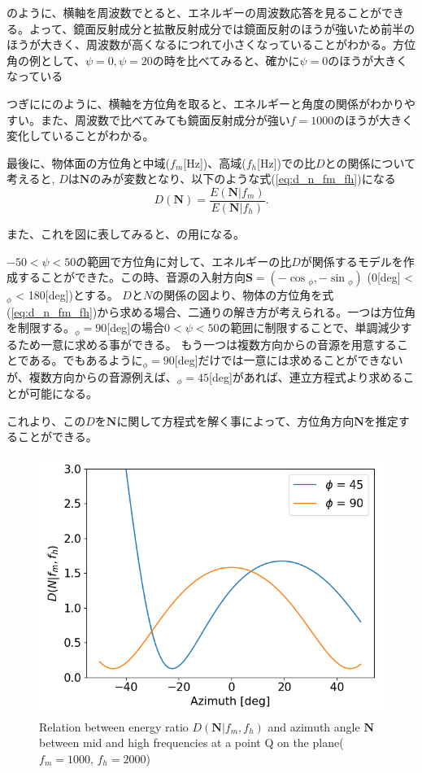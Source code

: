 のように、横軸を周波数でとると、エネルギーの周波数応答を見ることができる。よって、鏡面反射成分と拡散反射成分では鏡面反射のほうが強いため前半のほうが大きく、周波数が高くなるにつれて小さくなっていることがわかる。方位角の例として、$\psi=0, \psi=20$の時を比べてみると、確かに$\psi=0$のほうが大きくなっている

つぎににのように、横軸を方位角を取ると、エネルギーと角度の関係がわかりやすい。また、周波数で比べてみても鏡面反射成分が強い$f=1000$のほうが大きく変化していることがわかる。

最後に、物体面の方位角と中域($f_m$[Hz])、高域($f_h$[Hz])での比$D$との関係について考えると, $D$は$\mathbf{N}$のみが変数となり、以下のような式(\ref{eq:d_n_fm_fh})になる
\begin{equation}
	\label{eq:d_n_fm_fh}
	D(\mathbf{N}) = \frac{E(\mathbf{N}|f_{m})}{E(\mathbf{N}|f_{h})}.
\end{equation}

また、これを図に表してみると、の用になる。

$-50< \psi < 50$の範囲で方位角に対して、エネルギーの比$D$が関係するモデルを作成することができた。この時、音源の入射方向$\mathbf{S} = (-\cos{_\phi}, -\sin{_\phi})$ (0[deg] < $_\phi$ < 180[deg])とする。
$D$と$N$の関係の図より、物体の方位角を式(\ref{eq:d_n_fm_fh})から求める場合、二通りの解き方が考えられる。一つは方位角を制限する。$_\phi=90$[deg]の場合$0<\psi<50$の範囲に制限することで、単調減少するため一意に求める事ができる。
もう一つは複数方向からの音源を用意することである。でもあるように$_\phi=90$[deg]だけでは一意には求めることができないが、複数方向からの音源例えば、$_\phi = 45$[deg]があれば、連立方程式より求めることが可能になる。

これより、この$D$を$\mathbf{N}$に関して方程式を解く事によって、方位角方向$\mathbf{N}$を推定することができる。

\begin{figure}[t]
  \begin{center}
  \vspace{1zh}
    \includegraphics[width=0.7\linewidth]{images/Re2_d_n.png}   
  \end{center}
  \caption{Relation between energy ratio $D(\mathbf{N}|f_m, f_h)$ and azimuth angle $\mathbf{N}$ between mid and high frequencies at a point Q on the plane($f_m = 1000$, $f_h = 2000$)}
  \label{fig:d-n}
\end{figure}

